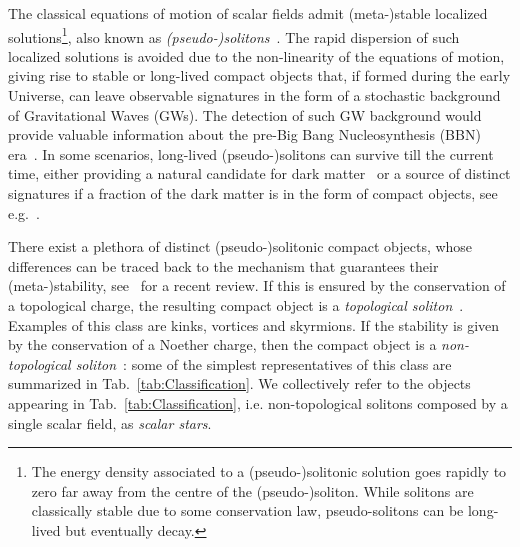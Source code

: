 \documentclass[11pt,a4paper]{article}
\begin{document}
The classical equations of motion of scalar fields admit (meta-)stable localized solutions\footnote{The energy density associated to a (pseudo-)solitonic solution goes rapidly to zero far away from the centre of the (pseudo-)soliton. While solitons are classically stable due to some conservation law, pseudo-solitons can be long-lived but eventually decay.}, also known as \textit{(pseudo-)solitons}~\cite{Weinberg:1996kr, Rubakov:2002fi, Manton:2004tk, Tong:2005un}. The rapid dispersion of such localized solutions is avoided due to the non-linearity of the equations of motion, giving rise to stable or long-lived compact objects that, if formed during the early Universe, can leave observable signatures in the form of a stochastic background of Gravitational Waves (GWs). The detection of such GW background would provide valuable information about the pre-Big Bang Nucleosynthesis (BBN) era~\cite{Kusenko:2008zm, Dolgov:2011cq, Amin:2011hj, Amin:2014eta, Amin:2013ika, Amin:2010jq, Antusch:2016con, Antusch:2017flz}. In some scenarios, long-lived (pseudo-)solitons can survive till the current time, either providing a natural candidate for dark matter~\cite{Kusenko:1997ad, Kusenko:1997si, Kusenko:2001vu, Olle:2019kbo} or a source of distinct signatures if a fraction of the dark matter is in the form of compact objects, see e.g.~\cite{Bai:2016wpg, Braaten:2016dlp, Levkov:2016rkk, Eby:2017xaw, Hui:2016ltb, Desjacques:2017fmf}.

There exist a plethora of distinct (pseudo-)solitonic compact objects, whose differences can be traced back to the mechanism that guarantees their (meta-)stability, see~\cite{Krippendorf:2018tei} for a recent review. If this is ensured by the conservation of a topological charge, the resulting compact object is a \textit{topological soliton}~\cite{Manton:2004tk}. Examples of this class are kinks, vortices and skyrmions. If the stability is given by the conservation of a Noether charge, then the compact object is a \textit{non-topological soliton}~\cite{Lee:1991ax}: some of the simplest representatives of this class are summarized in Tab.\ \ref{tab:Classification}. We collectively refer to the objects appearing in Tab.\ \ref{tab:Classification}, i.e. non-topological solitons composed by a single scalar field, as \textit{scalar stars}.
\end{document}
